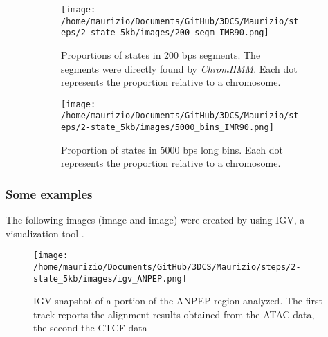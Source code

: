\begin{figure}[H]
  \centering
  \begin{subfigure}[t]{0.49\textwidth}
    \texttt{[image: /home/maurizio/Documents/GitHub/3DCS/Maurizio/steps/2-state\_5kb/images/200\_segm\_IMR90.png]}
    \caption{Proportions of states in 200 bps segments. The segments were directly found by \textit{ChromHMM}. Each dot represents the proportion relative to a chromosome.}
    \label{fig: proportions in segments}
  \end{subfigure}
  \begin{subfigure}[t]{0.49\textwidth}
      \texttt{[image: /home/maurizio/Documents/GitHub/3DCS/Maurizio/steps/2-state\_5kb/images/5000\_bins\_IMR90.png]}
      \caption{Proportion of states in 5000 bps long bins. Each dot represents the proportion relative to a chromosome.}
      \label{fig: proportions in bins}
  \end{subfigure}
  \caption{}
  \label{fig: proportions bins and steps}
\end{figure}

\subsubsection{Some examples}

The following images (image and image) were created by using IGV, a visualization tool
\cite{robinsonIgvJsEmbeddable2020a,robinsonIntroductionIntegrativeGenomics}
.

\begin{figure}[H]
  \centering
  \texttt{[image: /home/maurizio/Documents/GitHub/3DCS/Maurizio/steps/2-state\_5kb/images/igv\_ANPEP.png]}
  \caption{IGV snapshot of a portion of the ANPEP region analyzed. The first track reports the alignment results obtained from the ATAC data, the second the CTCF data}
  \label{fig: ANPEP igv}
\end{figure}
